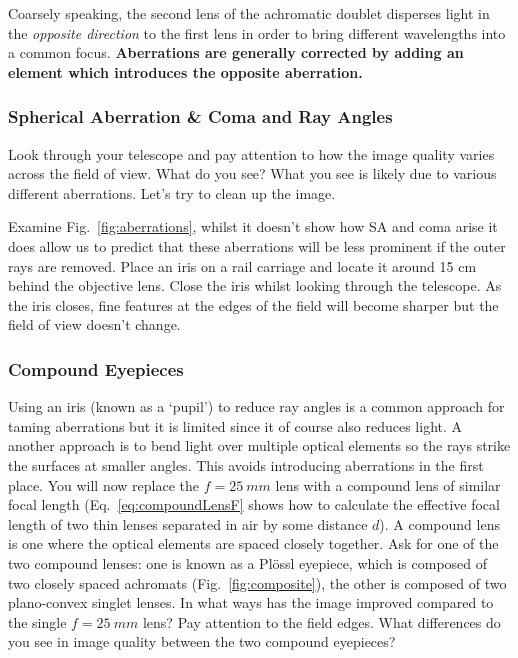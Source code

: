 \documentclass[a4paper]{report}
\begin{document}
Coarsely speaking, the second lens of the achromatic doublet disperses light in the \textit{opposite direction} to the first lens in order to bring different wavelengths into a common focus. 
\textbf{Aberrations are generally corrected by adding an element which introduces the opposite aberration.}






\subsubsection{Spherical Aberration \& Coma and Ray Angles}
Look through your telescope and pay attention to how the image quality varies across the field of view. 
What do you see?
What you see is likely due to various different aberrations. 
Let's try to clean up the image. 

Examine Fig.~\ref{fig:aberrations}, whilst it doesn't show how SA and coma arise it does allow us to predict that these aberrations will be less prominent if the outer rays are removed. 
Place an iris on a rail carriage and locate it around 15 cm behind the objective lens. 
Close the iris whilst looking through the telescope. 
As the iris closes, fine features at the edges of the field will become sharper but the field of view doesn't change. 




\subsubsection{Compound Eyepieces}
Using an iris (known as a `pupil') to reduce ray angles is a common approach for taming aberrations but it is limited since it of course also reduces light. 
A another approach is to bend light over multiple optical elements so the rays strike the surfaces at smaller angles. 
This avoids introducing aberrations in the first place. 
You will now replace the $f=25~mm$ lens with a compound lens of similar focal length (Eq.~\ref{eq:compoundLensF} shows how to calculate the effective focal length of two thin lenses separated in air by some distance $d$). 
A compound lens is one where the optical elements are spaced closely together. 
Ask for one of the two compound lenses: one is known as a Pl\"{o}ssl eyepiece, which is composed of two closely spaced achromats (Fig.~\ref{fig:composite}), the other is composed of two plano-convex singlet lenses. 
In what ways has the image improved compared to the single $f=25~mm$ lens?
Pay attention to the field edges. 
What differences do you see in image quality between the two compound eyepieces?
\end{document}
